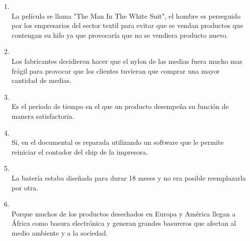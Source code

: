 \documentclass[spanish,openany]{report}
\begin{document}
\begin{enumerate}
            El problema real de la impresora es la existencia de un bloqueo automático de la impresión una vez se llega a un numero predeterminad
            de impresiones, problema de fácil solución si en vez de bloquear la impresión notificásemos al usuario de que la esponja que absorbe la tinta de la limpieza de cabezales esta sucia y necesita una limpieza permitiendo al usuario reiniciar el contador fácilmente. 
        \item{}\\
            La película se llama "The Man In The White Suit", el hombre es perseguido por los empresarios del sector textil para evitar
            que se vendan productos que contengan su hilo ya que provocaría que no se vendiera producto nuevo.
        \item{}\\
            Los fabricantes decidieron hacer que el nylon de las medias fuera mucho mas frágil para provocar que los clientes
            tuvieran que comprar una mayor cantidad de medias.
        \item{}\\
            Es el periodo de tiempo en el que un producto desempeña su función de manera satisfactoria.
        \item{}\\
            Si, en el documental es reparada utilizando un software que le permite reiniciar el contador del chip de la impresora.
        \item{}\\
            La batería estaba diseñada para durar 18 meses  y no era posible reemplazarla por otra. 
        \item{}\\
            Porque muchos de los productos desechados en Europa y América llegan a África como basura electrónica y generan 
            grandes basureros que afectan al medio ambiente y a la sociedad.
\end{enumerate}
\end{document}

